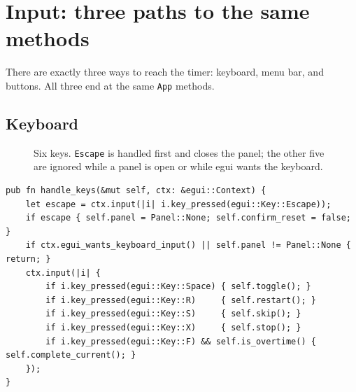 \clearpage
\section{Input: three paths to the same methods}

There are exactly three ways to reach the timer: keyboard, menu bar, and buttons. All
three end at the same \texttt{App} methods.

\subsection{Keyboard}

\begin{figure}[H]
\centering
{}
\caption{Six keys. \texttt{Escape} is handled first and closes the panel; the other five
are ignored while a panel is open or while egui wants the keyboard.}
\label{fig:keys}
\end{figure}

\begin{lstlisting}[caption={\file{app.rs} lines 190--216. The guard at the top is what
keeps the timer from reacting while the user is typing in a settings field.}]
pub fn handle_keys(&mut self, ctx: &egui::Context) {
    let escape = ctx.input(|i| i.key_pressed(egui::Key::Escape));
    if escape { self.panel = Panel::None; self.confirm_reset = false; }
    if ctx.egui_wants_keyboard_input() || self.panel != Panel::None { return; }
    ctx.input(|i| {
        if i.key_pressed(egui::Key::Space) { self.toggle(); }
        if i.key_pressed(egui::Key::R)     { self.restart(); }
        if i.key_pressed(egui::Key::S)     { self.skip(); }
        if i.key_pressed(egui::Key::X)     { self.stop(); }
        if i.key_pressed(egui::Key::F) && self.is_overtime() { self.complete_current(); }
    });
}
\end{lstlisting}

